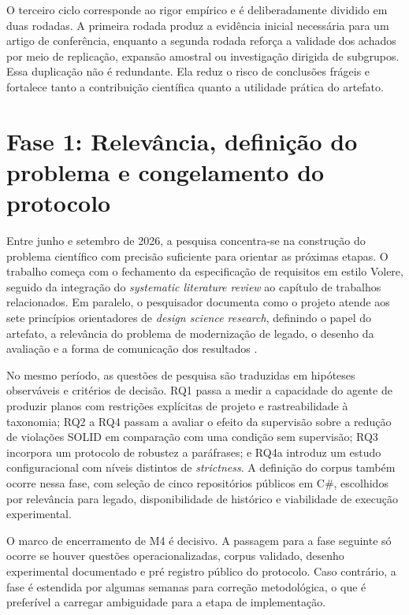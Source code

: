 \documentclass[12pt,a4paper]{article}
\begin{document}
O terceiro ciclo corresponde ao rigor empírico e é deliberadamente dividido em duas rodadas. A primeira rodada produz a evidência inicial necessária para um artigo de conferência, enquanto a segunda rodada reforça a validade dos achados por meio de replicação, expansão amostral ou investigação dirigida de subgrupos. Essa duplicação não é redundante. Ela reduz o risco de conclusões frágeis e fortalece tanto a contribuição científica quanto a utilidade prática do artefato.

\section{Fase 1: Relevância, definição do problema e congelamento do protocolo}

Entre junho e setembro de 2026, a pesquisa concentra-se na construção do problema científico com precisão suficiente para orientar as próximas etapas. O trabalho começa com o fechamento da especificação de requisitos em estilo Volere, seguido da integração do \textit{systematic literature review} ao capítulo de trabalhos relacionados. Em paralelo, o pesquisador documenta como o projeto atende aos sete princípios orientadores de \textit{design science research}, definindo o papel do artefato, a relevância do problema de modernização de legado, o desenho da avaliação e a forma de comunicação dos resultados \cite{hevner2004}.

No mesmo período, as questões de pesquisa são traduzidas em hipóteses observáveis e critérios de decisão. RQ1 passa a medir a capacidade do agente de produzir planos com restrições explícitas de projeto e rastreabilidade à taxonomia; RQ2 a RQ4 passam a avaliar o efeito da supervisão sobre a redução de violações SOLID em comparação com uma condição sem supervisão; RQ3 incorpora um protocolo de robustez a paráfrases; e RQ4a introduz um estudo configuracional com níveis distintos de \textit{strictness}. A definição do corpus também ocorre nessa fase, com seleção de cinco repositórios públicos em C\#, escolhidos por relevância para legado, disponibilidade de histórico e viabilidade de execução experimental.

O marco de encerramento de M4 é decisivo. A passagem para a fase seguinte só ocorre se houver questões operacionalizadas, corpus validado, desenho experimental documentado e pré registro público do protocolo. Caso contrário, a fase é estendida por algumas semanas para correção metodológica, o que é preferível a carregar ambiguidade para a etapa de implementação.
\end{document}
